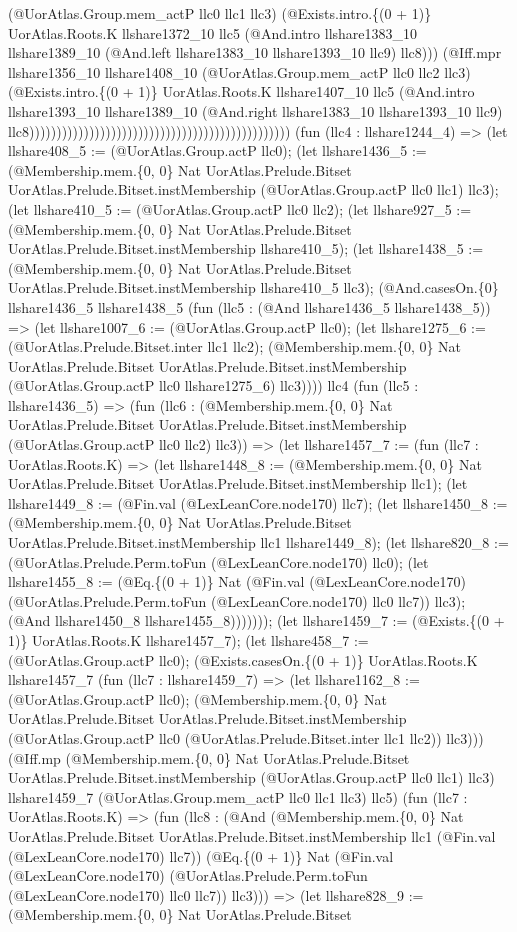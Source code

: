 \documentclass[11pt]{article}
\begin{document}
(@UorAtlas.Group.mem\_actP llc0 llc1 llc3) (@Exists.intro.\{(0 + 1)\} UorAtlas.Roots.K llshare1372\_10 llc5 (@And.intro llshare1383\_10 llshare1389\_10 (@And.left llshare1383\_10 llshare1393\_10 llc9) llc8))) (@Iff.mpr llshare1356\_10 llshare1408\_10 (@UorAtlas.Group.mem\_actP llc0 llc2 llc3) (@Exists.intro.\{(0 + 1)\} UorAtlas.Roots.K llshare1407\_10 llc5 (@And.intro llshare1393\_10 llshare1389\_10 (@And.right llshare1383\_10 llshare1393\_10 llc9) llc8)))))))))))))))))))))))))))))))))))))))))))))))) (fun (llc4 : llshare1244\_4) => (let llshare408\_5 := (@UorAtlas.Group.actP llc0); (let llshare1436\_5 := (@Membership.mem.\{0, 0\} Nat UorAtlas.Prelude.Bitset UorAtlas.Prelude.Bitset.instMembership (@UorAtlas.Group.actP llc0 llc1) llc3); (let llshare410\_5 := (@UorAtlas.Group.actP llc0 llc2); (let llshare927\_5 := (@Membership.mem.\{0, 0\} Nat UorAtlas.Prelude.Bitset UorAtlas.Prelude.Bitset.instMembership llshare410\_5); (let llshare1438\_5 := (@Membership.mem.\{0, 0\} Nat UorAtlas.Prelude.Bitset UorAtlas.Prelude.Bitset.instMembership llshare410\_5 llc3); (@And.casesOn.\{0\} llshare1436\_5 llshare1438\_5 (fun (llc5 : (@And llshare1436\_5 llshare1438\_5)) => (let llshare1007\_6 := (@UorAtlas.Group.actP llc0); (let llshare1275\_6 := (@UorAtlas.Prelude.Bitset.inter llc1 llc2); (@Membership.mem.\{0, 0\} Nat UorAtlas.Prelude.Bitset UorAtlas.Prelude.Bitset.instMembership (@UorAtlas.Group.actP llc0 llshare1275\_6) llc3)))) llc4 (fun (llc5 : llshare1436\_5) => (fun (llc6 : (@Membership.mem.\{0, 0\} Nat UorAtlas.Prelude.Bitset UorAtlas.Prelude.Bitset.instMembership (@UorAtlas.Group.actP llc0 llc2) llc3)) => (let llshare1457\_7 := (fun (llc7 : UorAtlas.Roots.K) => (let llshare1448\_8 := (@Membership.mem.\{0, 0\} Nat UorAtlas.Prelude.Bitset UorAtlas.Prelude.Bitset.instMembership llc1); (let llshare1449\_8 := (@Fin.val (@LexLeanCore.node170) llc7); (let llshare1450\_8 := (@Membership.mem.\{0, 0\} Nat UorAtlas.Prelude.Bitset UorAtlas.Prelude.Bitset.instMembership llc1 llshare1449\_8); (let llshare820\_8 := (@UorAtlas.Prelude.Perm.toFun (@LexLeanCore.node170) llc0); (let llshare1455\_8 := (@Eq.\{(0 + 1)\} Nat (@Fin.val (@LexLeanCore.node170) (@UorAtlas.Prelude.Perm.toFun (@LexLeanCore.node170) llc0 llc7)) llc3); (@And llshare1450\_8 llshare1455\_8))))))); (let llshare1459\_7 := (@Exists.\{(0 + 1)\} UorAtlas.Roots.K llshare1457\_7); (let llshare458\_7 := (@UorAtlas.Group.actP llc0); (@Exists.casesOn.\{(0 + 1)\} UorAtlas.Roots.K llshare1457\_7 (fun (llc7 : llshare1459\_7) => (let llshare1162\_8 := (@UorAtlas.Group.actP llc0); (@Membership.mem.\{0, 0\} Nat UorAtlas.Prelude.Bitset UorAtlas.Prelude.Bitset.instMembership (@UorAtlas.Group.actP llc0 (@UorAtlas.Prelude.Bitset.inter llc1 llc2)) llc3))) (@Iff.mp (@Membership.mem.\{0, 0\} Nat UorAtlas.Prelude.Bitset UorAtlas.Prelude.Bitset.instMembership (@UorAtlas.Group.actP llc0 llc1) llc3) llshare1459\_7 (@UorAtlas.Group.mem\_actP llc0 llc1 llc3) llc5) (fun (llc7 : UorAtlas.Roots.K) => (fun (llc8 : (@And (@Membership.mem.\{0, 0\} Nat UorAtlas.Prelude.Bitset UorAtlas.Prelude.Bitset.instMembership llc1 (@Fin.val (@LexLeanCore.node170) llc7)) (@Eq.\{(0 + 1)\} Nat (@Fin.val (@LexLeanCore.node170) (@UorAtlas.Prelude.Perm.toFun (@LexLeanCore.node170) llc0 llc7)) llc3))) => (let llshare828\_9 := (@Membership.mem.\{0, 0\} Nat UorAtlas.Prelude.Bitset 
\end{document}
